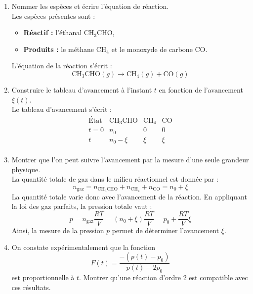 \documentclass[a4paper,10pt,notitlepage,oneside]{article}
\theoremstyle{plain}
\begin{document}
\begin{enumerate}
    \item Nommer les espèces et écrire l'équation de réaction.\\
    
    Les espèces présentes sont :
    \begin{itemize}
        \item \textbf{\color{BlueViolet}Réactif :} l'éthanal $\text{CH}_3\text{CHO}$,
        \item \textbf{\color{BlueViolet}Produits :} le méthane $\text{CH}_4$ et le monoxyde de carbone $\text{CO}$.
    \end{itemize}
    L'équation de la réaction s'écrit :
    \begin{equation*}
        \boxed{\text{CH}_3\text{CHO}(g) \longrightarrow \text{CH}_4(g) + \text{CO}(g)}
    \end{equation*}
    
    \item Construire le tableau d'avancement à l'instant $t$ en fonction de l'avancement $\xi(t)$.\\
    
    Le tableau d'avancement s'écrit :
    \[
    \begin{array}{c|c|c|c}
        \text{État} & \text{CH}_3\text{CHO} & \text{CH}_4 & \text{CO} \\
        \hline
        t = 0 & n_0 & 0 & 0 \\
        t & n_0 - \xi & \xi & \xi \\
    \end{array}
    \]
    
    \item Montrer que l'on peut suivre l'avancement par la mesure d'une seule grandeur physique.\\
    La quantité totale de gaz dans le milieu réactionnel est donnée par :
    \[
        n_{\text{gaz}} = n_{\text{CH}_3\text{CHO}} + n_{\text{CH}_4} + n_{\text{CO}} = n_0 + \xi
    \]
    La quantité totale varie donc avec l'avancement de la réaction. En appliquant la loi des gaz parfaits, la pression totale vaut :
    \[
        p = n_{\text{gaz}} \dfrac{RT}{V} = \left( n_0 + \xi \right) \dfrac{RT}{V} = p_0 + \dfrac{RT}{V} \xi
    \]
    Ainsi, la mesure de la pression $p$ permet de déterminer l'avancement $\xi$.

    \item On constate expérimentalement que la fonction 
    \[
    F(t) = \dfrac{- (p(t) - p_0)}{p(t) - 2p_0}
    \]
    est proportionnelle à $t$. Montrer qu'une réaction d'ordre 2 est compatible avec ces résultats.\\
    

\end{enumerate}
\end{document}
